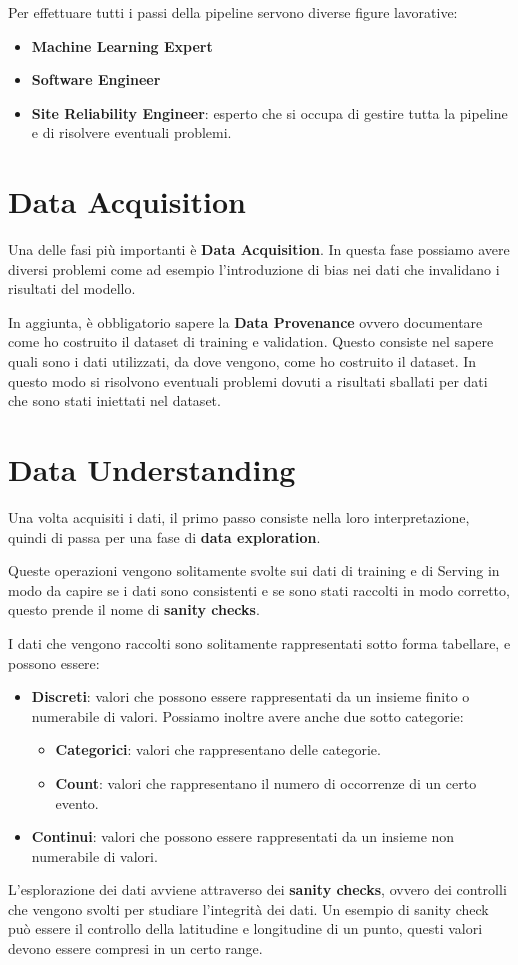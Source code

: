 Per effettuare tutti i passi della pipeline servono diverse figure lavorative:
\begin{itemize}
    \item \textbf{Machine Learning Expert}
    \item \textbf{Software Engineer}
    \item \textbf{Site Reliability Engineer}: esperto che si occupa di gestire
          tutta la pipeline e di risolvere eventuali problemi.
\end{itemize}
\section{Data Acquisition}
Una delle fasi più importanti è \textbf{Data Acquisition}. In questa fase possiamo
avere diversi problemi come ad esempio l'introduzione di bias nei dati che
invalidano i risultati del modello.

In aggiunta, è obbligatorio sapere la \textbf{Data Provenance} ovvero documentare
come ho costruito il dataset di training e validation. Questo consiste nel sapere
quali sono i dati utilizzati, da dove vengono, come ho costruito il dataset. In
questo modo si risolvono eventuali problemi dovuti a risultati sballati per dati
che sono stati iniettati nel dataset.
\section{Data Understanding}
Una volta acquisiti i dati, il primo passo consiste nella loro interpretazione,
quindi di passa per una fase di \textbf{data exploration}.

Queste operazioni vengono solitamente svolte sui dati di training e di Serving
in modo da capire se i dati sono consistenti e se sono stati raccolti in modo
corretto, questo prende il nome di \textbf{sanity checks}.

I dati che vengono raccolti sono solitamente rappresentati sotto forma tabellare,
e possono essere:
\begin{itemize}
    \item \textbf{Discreti}: valori che possono essere rappresentati da un insieme
          finito o numerabile di valori. Possiamo inoltre avere anche due sotto
          categorie:
          \begin{itemize}
              \item \textbf{Categorici}: valori che rappresentano delle categorie.
              \item \textbf{Count}: valori che rappresentano il numero di
                    occorrenze di un certo evento.
          \end{itemize}
    \item \textbf{Continui}: valori che possono essere rappresentati da un insieme
          non numerabile di valori.
\end{itemize}
L'esplorazione dei dati avviene attraverso dei \textbf{sanity checks}, ovvero dei
controlli che vengono svolti per studiare l'integrità dei dati. Un esempio di sanity
check può essere il controllo della latitudine e longitudine di un punto, questi
valori devono essere compresi in un certo range.

